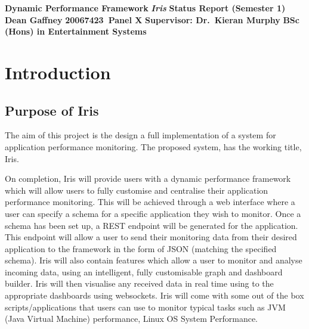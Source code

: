 \documentclass[12pt,a4paper,titlepage]{report}
\newcommand\AcademicTitle{Dynamic Performance Framework}
\newcommand\CommericalTitle{Iris}
\newcommand\Author{Dean Gaffney}
\newcommand\StudentID{20067423}
\newcommand\Report{Status Report (Semester 1)}
\newcommand\Reader{Supervisor: Dr.~Kieran Murphy}
\begin{document}

\thispagestyle{empty}
\begin{center}
\mbox{}\vfill
{\fontsize{18pt}{20pt}\selectfont \bfseries \AcademicTitle}
\vfill
{\fontsize{14pt}{20pt}\selectfont \bfseries\itshape \CommericalTitle}
\vfill
{\fontsize{12pt}{20pt}\selectfont \bfseries \Report}
\vfill
{\fontsize{14pt}{20pt}\selectfont \bfseries \Author}
\vfill
{\fontsize{14pt}{20pt}\selectfont \bfseries \StudentID\ Panel X}
\vfill
{\fontsize{14pt}{20pt}\selectfont \bfseries \Reader}
\vfill
{\fontsize{14pt}{20pt}\selectfont \bfseries BSc (Hons) in Entertainment Systems}
\vfill
\end{center}
\clearpage

\tableofcontents
\listoftables
\listoffigures

\clearpage
{}
\setcounter{page}{1}


\chapter{Introduction}

\section{Purpose of Iris}

The aim of this project is the design a full implementation of a system for application performance monitoring. The proposed system, has the working title,  Iris. 

On completion, Iris will provide users with a dynamic performance framework which will allow users to fully customise and centralise their application performance monitoring. This will be achieved through a web interface where a user can specify a schema for a specific application they wish to monitor. Once a schema has been set up, a REST endpoint will be generated for the application. This endpoint will allow a user to send their monitoring data from their desired application to the framework in the form of JSON (matching the specified schema). Iris will also contain features which allow a user to monitor and analyse incoming data, using an intelligent, fully customisable graph and dashboard builder. Iris will then visualise any received data in real time using to the appropriate dashboards using websockets. Iris will come with some out of the box scripts/applications that users can use to monitor typical tasks such as JVM (Java Virtual Machine) performance, Linux OS System Performance.
\end{document}
